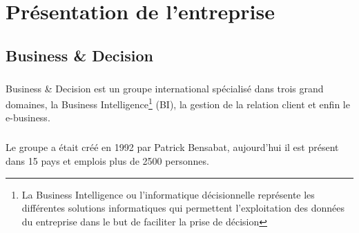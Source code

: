 \chapter{Présentation de l'entreprise}
\section{Business \& Decision}
        \paragraph{}
        Business \& Decision est un groupe international spécialisé dans trois grand domaines, la Business Intelligence\footnote{La Business Intelligence ou l'informatique décisionnelle représente les différentes solutions informatiques qui permettent l'exploitation des données du entreprise dans le but de faciliter la prise de décision} (BI), la gestion de la relation client et enfin le e-business. 
        \paragraph{}
        Le groupe a était créé en 1992 par Patrick Bensabat, aujourd'hui il est présent dans 15 pays et emplois plus de 2500 personnes.
